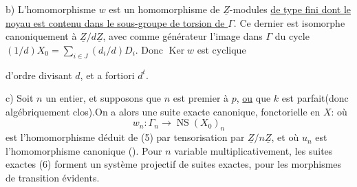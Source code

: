 b) L'homomorphisme $w$ est un homomorphisme de $\underline Z$-modules \uline{de type fini dont le noyau est contenu dans le sous-groupe de torsion de $\Gamma$}. Ce dernier est isomorphe canoniquement à $\underline Z/d\underline Z$, avec comme générateur l'image dans $\Gamma$ du cycle $(1/d)X_0=\sum_{i\in J}(d_i/d)D_i$. Donc $\operatorname{Ker}w$ est cyclique



d'ordre  divisant $d$, et a fortiori $d^t$.

c)  Soit $n$ un entier, et supposons que $n$ est premier à $p$, \uline{ou} que  $k$ est parfait(donc algébriquement clos).On a alors une suite exacte canonique, fonctorielle en $X$:
où
\[
w_n:\Gamma_n\longrightarrow\operatorname{NS}(X_0)_n
\]
est l'homomorphisme déduit de (5) par tensorisation par $\underline Z/n\underline Z$,  et où $u_n$ est l'homomorphisme canonique (\qquad). Pour $n$ variable multiplicativement, les suites exactes (6) forment un système projectif de suites exactes, pour les morphismes de transition évidents.

\margin{$\times\quad\times\quad\times$}

